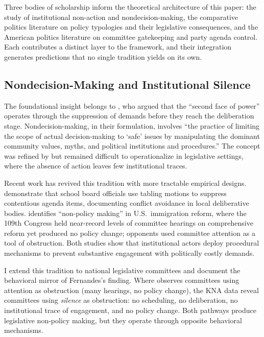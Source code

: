 \documentclass[11pt]{article}
\begin{document}
Three bodies of scholarship inform the theoretical architecture of this paper: the study of institutional non-action and nondecision-making, the comparative politics literature on policy typologies and their legislative consequences, and the American politics literature on committee gatekeeping and party agenda control. Each contributes a distinct layer to the framework, and their integration generates predictions that no single tradition yields on its own.

\subsection{Nondecision-Making and Institutional Silence}

The foundational insight belongs to \citet{bachrach1962}, who argued that the ``second face of power'' operates through the suppression of demands before they reach the deliberation stage. Nondecision-making, in their formulation, involves ``the practice of limiting the scope of actual decision-making to `safe' issues by manipulating the dominant community values, myths, and political institutions and procedures.'' The concept was refined by \citet{lukes2005} but remained difficult to operationalize in legislative settings, where the absence of action leaves few institutional traces.

Recent work has revived this tradition with more tractable empirical designs. \citet{holman2025} demonstrate that school board officials use tabling motions to suppress contentious agenda items, documenting conflict avoidance in local deliberative bodies. \citet{fernandes2024} identifies ``non-policy making'' in U.S.\ immigration reform, where the 109th Congress held near-record levels of committee hearings on comprehensive reform yet produced no policy change; opponents used committee attention as a tool of obstruction. Both studies show that institutional actors deploy procedural mechanisms to prevent substantive engagement with politically costly demands.

I extend this tradition to national legislative committees and document the behavioral mirror of Fernandes's finding. Where \citeauthor{fernandes2024} observes committees using attention as obstruction (many hearings, no policy change), the KNA data reveal committees using \textit{silence} as obstruction: no scheduling, no deliberation, no institutional trace of engagement, and no policy change. Both pathways produce legislative non-policy making, but they operate through opposite behavioral mechanisms.
\end{document}
